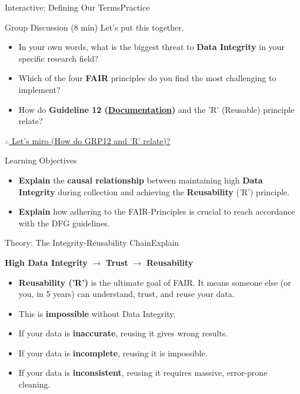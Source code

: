 \begin{frame}{Interactive: Defining Our Terms}{Practice}
    \begin{block}{Group Discussion (8 min)}
        Let's put this together.
        \begin{itemize}
            \item In your own words, what is the biggest threat to \textbf{Data Integrity} in your specific research field?
            \pause
            \item Which of the four \textbf{FAIR} principles do you find the most challenging to implement?
            \pause
            \item How do \textbf{Guideline 12 (\href{https://wissenschaftliche-integritaet.de/en/code-of-conduct/documentation/}{Documentation})} and the 'R' (Reusable) principle relate?
        \end{itemize}
    \end{block}
    \href{https://miro.com/app/board/uXjVJpI_9Kc=/?moveToWidget=3458764648827295133&cot=14}{$\therefore$ Let's miro (How do GRP12 and ’R’ relate)?}
\end{frame}

\begin{frame}{Learning Objectives}
    \begin{itemize}
        \item \textbf{Explain} the \textbf{causal relationship} between maintaining high \textbf{Data Integrity} during collection and achieving the \textbf{Reusability} ('R') principle.
        \item \textbf{Explain} how adhering to the FAIR-Principles is crucial to reach accordance with the DFG guidelines.
    \end{itemize}
\end{frame}

\begin{frame}{Theory: The Integrity-Reusability Chain}{Explain}
    \begin{center}
        \textbf{High Data Integrity} $\rightarrow$ \textbf{Trust} $\rightarrow$ \textbf{Reusability}
    \end{center}
    \vfill
    \begin{itemize}
        \item \textbf{Reusability ('R')} is the ultimate goal of FAIR. It means someone else (or you, in 5 years) can understand, trust, and reuse your data.
        \pause
        \item This is \textbf{impossible} without Data Integrity.
        \pause
        \item If your data is \textbf{inaccurate}, reusing it gives wrong results.
        \item If your data is \textbf{incomplete}, reusing it is impossible.
        \item If your data is \textbf{inconsistent}, reusing it requires massive, error-prone cleaning.
    \end{itemize}
\end{frame}

